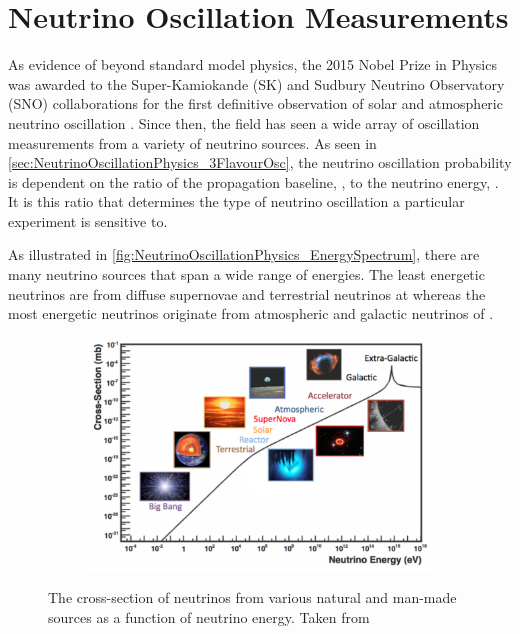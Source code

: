 \section{Neutrino Oscillation Measurements}
\label{sec:NeutrinoOscillationPhysics_OscillationMeasurements}

As evidence of beyond standard model physics, the 2015 Nobel Prize in Physics was awarded to the Super-Kamiokande (SK) \cite{PhysRevLett.93.101801} and Sudbury Neutrino Observatory (SNO) \cite{PhysRevLett.89.011301} collaborations for the first definitive observation of solar and atmospheric neutrino oscillation \cite{2015NobelPhysicsPrize}. Since then, the field has seen a wide array of oscillation measurements from a variety of neutrino sources. As seen in \autoref{sec:NeutrinoOscillationPhysics_3FlavourOsc}, the neutrino oscillation probability is dependent on the ratio of the propagation baseline, , to the neutrino energy, . It is this ratio that determines the type of neutrino oscillation a particular experiment is sensitive to.

As illustrated in \autoref{fig:NeutrinoOscillationPhysics_EnergySpectrum}, there are many neutrino sources that span a wide range of energies. The least energetic neutrinos are from diffuse supernovae and terrestrial neutrinos at  whereas the most energetic neutrinos originate from atmospheric and galactic neutrinos of .

\begin{figure}[h]
  \begin{subfigure}[t]{0.95\textwidth}
    \includegraphics[width=\textwidth, trim={0mm 0mm 0mm 0mm}, clip,page=1]{Figures/Theory/EnergySpectrum.pdf}
  \end{subfigure}
  \caption{The cross-section of neutrinos from various natural and man-made sources as a function of neutrino energy. Taken from \cite{Formaggio:2012cpf}}
  \label{fig:NeutrinoOscillationPhysics_EnergySpectrum}
\end{figure}


